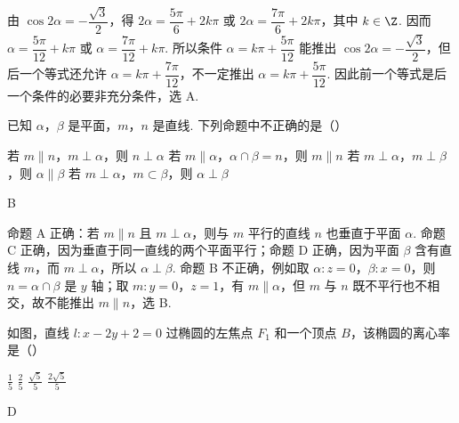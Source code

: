 \begin{solution}
由 \(\cos 2\alpha=-\dfrac{\sqrt{3}}{2}\)，得
\(2\alpha=\dfrac{5\pi}{6}+2k\pi\) 或 \(2\alpha=\dfrac{7\pi}{6}+2k\pi\)，其中 \(k\in\Z\). 因而
\(\alpha=\dfrac{5\pi}{12}+k\pi\) 或 \(\alpha=\dfrac{7\pi}{12}+k\pi\). 所以条件 \(\alpha=k\pi+\dfrac{5\pi}{12}\) 能推出 \(\cos 2\alpha=-\dfrac{\sqrt{3}}{2}\)，但后一个等式还允许 \(\alpha=k\pi+\dfrac{7\pi}{12}\)，不一定推出 \(\alpha=k\pi+\dfrac{5\pi}{12}\). 因此前一个等式是后一个条件的必要非充分条件，选 A.
\end{solution}

\begin{problem}
已知 \(\alpha\)，\(\beta\) 是平面，\(m\)，\(n\) 是直线. 下列命题中不正确的是（\quad）

\choices
    {若 \(m \parallel n\)，\(m \perp \alpha\)，则 \(n \perp \alpha\)}
    {若 \(m \parallel \alpha\)，\(\alpha \cap \beta = n\)，则 \(m \parallel n\)}
    {若 \(m \perp \alpha\)，\(m \perp \beta\)，则 \(\alpha \parallel \beta\)}
    {若 \(m \perp \alpha\)，\(m \subset \beta\)，则 \(\alpha \perp \beta\)}
\end{problem}

\begin{answer}
B
\end{answer}

\begin{solution}
命题 A 正确：若 \(m\parallel n\) 且 \(m\perp\alpha\)，则与 \(m\) 平行的直线 \(n\) 也垂直于平面 \(\alpha\). 命题 C 正确，因为垂直于同一直线的两个平面平行；命题 D 正确，因为平面 \(\beta\) 含有直线 \(m\)，而 \(m\perp\alpha\)，所以 \(\alpha\perp\beta\). 命题 B 不正确，例如取 \(\alpha:z=0\)，\(\beta:x=0\)，则 \(n=\alpha\cap\beta\) 是 \(y\) 轴；取 \(m:y=0\)，\(z=1\)，有 \(m\parallel\alpha\)，但 \(m\) 与 \(n\) 既不平行也不相交，故不能推出 \(m\parallel n\)，选 B.
\end{solution}

\begin{problem}
如图，直线 \(l: x - 2y + 2 = 0\) 过椭圆的左焦点 \(F_1\) 和一个顶点 \(B\)，该椭圆的离心率是（\quad）


\choices
    {\(\frac{1}{5}\)}
    {\(\frac{2}{5}\)}
    {\(\frac{\sqrt{5}}{5}\)}
    {\(\frac{2\sqrt{5}}{5}\)}
\end{problem}

\begin{answer}
D
\end{answer}

